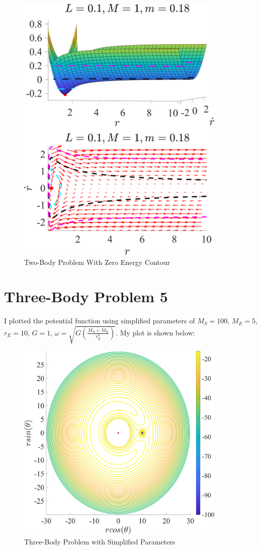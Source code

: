 \documentclass[11pt]{article}
\begin{document}
\begin{figure}[h]
\centering
\includegraphics[width=10cm]{2 Body Problem Zero Energy.png}
\caption{Two-Body Problem With Zero Energy Contour}
\label{zero}
\end{figure}

\clearpage

\section*{Three-Body Problem 5}
I plotted the potential function using simplified parameters of $M_S = 100$, $M_E = 5$, $r_E = 10$, $G = 1$, $\omega = \sqrt{G(\frac{M_S + M_E}{r_E^3})}$. My plot is shown below:

\begin{figure}[h]
\centering
\includegraphics[width=10cm]{three_body_prob.png}
\caption{Three-Body Problem with Simplified Parameters}
\label{zero}
\end{figure}
\end{document}
